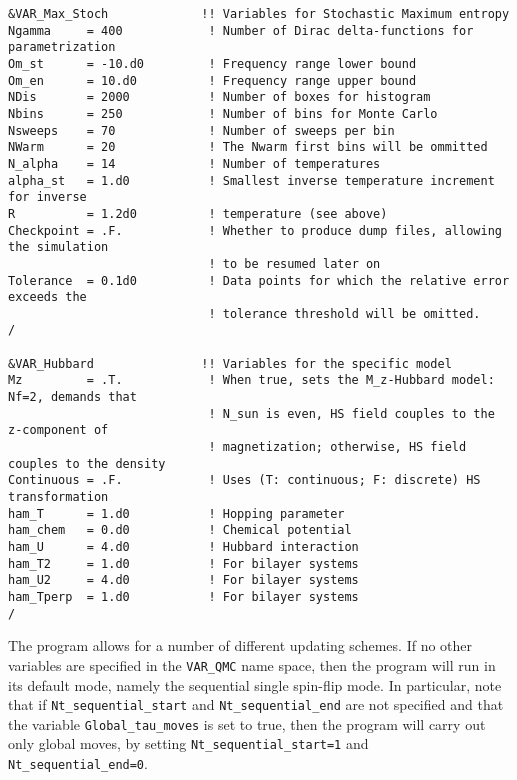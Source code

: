 \begin{lstlisting}[style=fortran,escapechar=\#,breaklines=true]
&VAR_Max_Stoch             !! Variables for Stochastic Maximum entropy
Ngamma     = 400            ! Number of Dirac delta-functions for parametrization
Om_st      = -10.d0         ! Frequency range lower bound
Om_en      = 10.d0          ! Frequency range upper bound
NDis       = 2000           ! Number of boxes for histogram
Nbins      = 250            ! Number of bins for Monte Carlo
Nsweeps    = 70             ! Number of sweeps per bin
NWarm      = 20             ! The Nwarm first bins will be ommitted
N_alpha    = 14             ! Number of temperatures
alpha_st   = 1.d0           ! Smallest inverse temperature increment for inverse
R          = 1.2d0          ! temperature (see above) 
Checkpoint = .F.            ! Whether to produce dump files, allowing the simulation
                            ! to be resumed later on
Tolerance  = 0.1d0          ! Data points for which the relative error exceeds the
                            ! tolerance threshold will be omitted.
/

&VAR_Hubbard               !! Variables for the specific model
Mz         = .T.            ! When true, sets the M_z-Hubbard model: Nf=2, demands that
                            ! N_sun is even, HS field couples to the z-component of
                            ! magnetization; otherwise, HS field couples to the density
Continuous = .F.            ! Uses (T: continuous; F: discrete) HS transformation
ham_T      = 1.d0           ! Hopping parameter
ham_chem   = 0.d0           ! Chemical potential
ham_U      = 4.d0           ! Hubbard interaction
ham_T2     = 1.d0           ! For bilayer systems
ham_U2     = 4.d0           ! For bilayer systems
ham_Tperp  = 1.d0           ! For bilayer systems
/
\end{lstlisting}
%
\FloatBarrier

The program allows for a number of different  updating schemes.  If no other variables are specified in the \texttt{VAR\_QMC} name space, then the program will run in its default mode, namely the sequential single spin-flip mode.
In particular, note that if \texttt{Nt\_sequential\_start}  and \texttt{Nt\_sequential\_end}  are not specified and that the variable \texttt{Global\_tau\_moves}  is set to true, then  the program will  carry out only global moves, by setting \texttt{Nt\_sequential\_start=1}  and \texttt{Nt\_sequential\_end=0}. 



